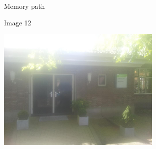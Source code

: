 \begin{frame}{Memory path}
  \begin{block}{Image 12}
    \begin{center}
      \includegraphics[height=6cm]{img/loci/12.jpg}
    \end{center}
  \end{block}
\end{frame}

